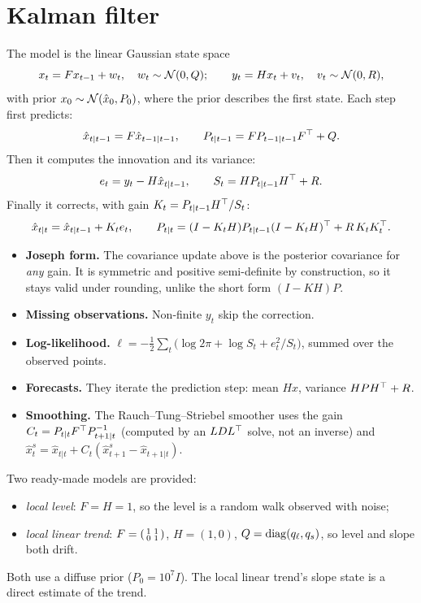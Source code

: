 \section{Kalman filter}
The model is the linear Gaussian state space
\[
  x_t=Fx_{t-1}+w_t,\quad w_t\sim\mathcal{N}(0,Q);\qquad y_t=Hx_t+v_t,\quad v_t\sim\mathcal{N}(0,R),
\]
with prior $x_0\sim\mathcal{N}(\hat x_0,P_0)$, where the prior describes the first state. Each step
first predicts:
\[
  \hat x_{t|t-1}=F\hat x_{t-1|t-1},\qquad P_{t|t-1}=FP_{t-1|t-1}F^\top+Q .
\]
Then it computes the innovation and its variance:
\[
  e_t=y_t-H\hat x_{t|t-1},\qquad S_t=HP_{t|t-1}H^\top+R .
\]
Finally it corrects, with gain $K_t=P_{t|t-1}H^\top/S_t$:
\[
  \hat x_{t|t}=\hat x_{t|t-1}+K_te_t,\qquad
  P_{t|t}=(I-K_tH)P_{t|t-1}(I-K_tH)^\top+R\,K_tK_t^\top .
\]
\begin{itemize}
  \item \textbf{Joseph form.} The covariance update above is the posterior covariance for
        \emph{any} gain. It is symmetric and positive semi-definite by construction, so it
        stays valid under rounding, unlike the short form $(I-KH)P$.
  \item \textbf{Missing observations.} Non-finite $y_t$ skip the correction.
  \item \textbf{Log-likelihood.}
        $\ell=-\tfrac12\sum_t\big(\log2\pi+\log S_t+e_t^2/S_t\big)$, summed over the observed
        points.
  \item \textbf{Forecasts.} They iterate the prediction step: mean $Hx$, variance
        $HPH^\top+R$.
  \item \textbf{Smoothing.} The Rauch--Tung--Striebel smoother uses the gain
        $C_t=P_{t|t}F^\top P_{t+1|t}^{-1}$ (computed by an $LDL^\top$ solve, not an inverse) and
        $\hat x^s_t=\hat x_{t|t}+C_t(\hat x^s_{t+1}-\hat x_{t+1|t})$.
\end{itemize}

Two ready-made models are provided:
\begin{itemize}
  \item \emph{local level}: $F=H=1$, so the level is a random walk observed with noise;
  \item \emph{local linear trend}: $F=\begin{psmallmatrix}1&1\\0&1\end{psmallmatrix}$,
        $H=(1,0)$, $Q=\operatorname{diag}(q_\ell,q_s)$, so level and slope both drift.
\end{itemize}
Both use a diffuse prior ($P_0=10^7I$). The local linear trend's slope state is a direct
estimate of the trend.
\begin{codepointers}
\end{codepointers}

